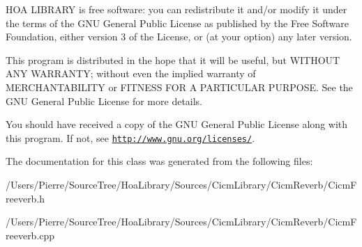 H\-O\-A L\-I\-B\-R\-A\-R\-Y is free software\-: you can redistribute it and/or modify it under the terms of the G\-N\-U General Public License as published by the Free Software Foundation, either version 3 of the License, or (at your option) any later version.

This program is distributed in the hope that it will be useful, but W\-I\-T\-H\-O\-U\-T A\-N\-Y W\-A\-R\-R\-A\-N\-T\-Y; without even the implied warranty of M\-E\-R\-C\-H\-A\-N\-T\-A\-B\-I\-L\-I\-T\-Y or F\-I\-T\-N\-E\-S\-S F\-O\-R A P\-A\-R\-T\-I\-C\-U\-L\-A\-R P\-U\-R\-P\-O\-S\-E. See the G\-N\-U General Public License for more details.

You should have received a copy of the G\-N\-U General Public License along with this program. If not, see \href{http://www.gnu.org/licenses/}{\tt http\-://www.\-gnu.\-org/licenses/}. 

The documentation for this class was generated from the following files\-:\begin{DoxyCompactItemize}
\item 
/\-Users/\-Pierre/\-Source\-Tree/\-Hoa\-Library/\-Sources/\-Cicm\-Library/\-Cicm\-Reverb/Cicm\-Freeverb.\-h\item 
/\-Users/\-Pierre/\-Source\-Tree/\-Hoa\-Library/\-Sources/\-Cicm\-Library/\-Cicm\-Reverb/Cicm\-Freeverb.\-cpp\end{DoxyCompactItemize}
